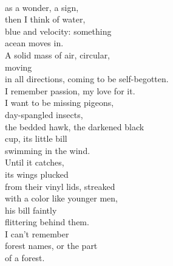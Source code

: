 \documentclass[smalldemyvopaper,11pt,twoside,onecolumn,openright,extrafontsizes]{memoir}
\begin{document}
\\as a wonder, a sign,
\\then I think of water,
\\blue and velocity: something
\\acean moves in.
\\A solid mass of air, circular,
\\moving
\\in all directions, coming to be self-begotten.
\\I remember passion, my love for it.
\\I want to be missing pigeons,
\\day-spangled insects,
\\the bedded hawk, the darkened black
\\cup, its little bill
\\swimming in the wind.
\\Until it catches,
\\its wings plucked
\\from their vinyl lids, streaked
\\with a color like younger men,
\\his bill faintly
\\flittering behind them.
\\I can't remember
\\forest names, or the part
\\of a forest.
\end{document}
